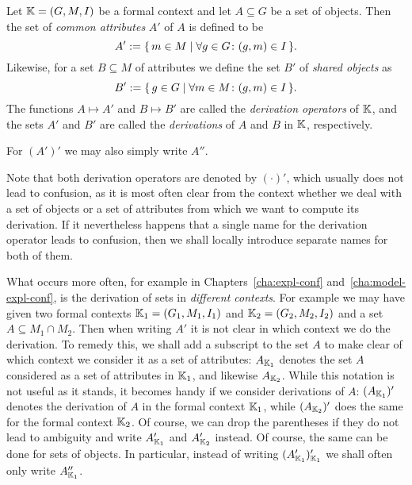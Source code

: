 \begin{Definition}
  \label{def:contextual-derivation}
  Let ${\mathbb{K}} = (G, M, I)$ be a formal context and let $A \subseteq G$ be a set of
  objects.  Then the set of \emph{common attributes} $A'$ of $A$ is defined to be
  \begin{equation*}
    A' := {\{\, m \in M \mid \forall g \in G \colon (g, m) \in I \,\}}.
  \end{equation*}
  Likewise, for a set $B \subseteq M$ of attributes we define the set $B'$ of \emph{shared
    objects} as
  \begin{equation*}
    B' := {\{\, g \in G \mid \forall m \in M \colon (g, m) \in I \,\}}.
  \end{equation*}
  The functions $A \mapsto A'$ and $B \mapsto B'$ are called the \emph{derivation
    operators} of ${\mathbb{K}}$, and the sets $A'$ and $B'$ are called the \emph{derivations}
  of $A$ and $B$ in ${\mathbb{K}}$, respectively.
\end{Definition}

For $(A')'$ we may also simply write $A''$.

Note that both derivation operators are denoted by $(\cdot)'$, which usually does not lead
to confusion, as it is most often clear from the context whether we deal with a set of
objects or a set of attributes from which we want to compute its derivation.  If it
nevertheless happens that a single name for the derivation operator leads to confusion,
then we shall locally introduce separate names for both of them.

What occurs more often, for example in Chapters~\ref{cha:expl-conf}
and~\ref{cha:model-expl-conf}, is the derivation of sets in \emph{different contexts}.
For example we may have given two formal contexts ${\mathbb{K}}_1 = (G_1, M_1, I_1)$ and ${\mathbb{K}}_2 = (G_2, M_2, I_2)$ and a set $A \subseteq M_1 \cap M_2$.  Then when writing $A'$ it is
not clear in which context we do the derivation.  To remedy this, we shall add a subscript
to the set $A$ to make clear of which context we consider it as a set of attributes:
$A_{{\mathbb{K}}_1}$ denotes the set $A$ considered as a set of attributes in ${\mathbb{K}}_1$, and
likewise $A_{{\mathbb{K}}_2}$.  While this notation is not useful as it stands, it becomes handy
if we consider derivations of $A$: $(A_{{\mathbb{K}}_1})'$ denotes the derivation of $A$ in the
formal context ${\mathbb{K}}_1$, while $(A_{{\mathbb{K}}_2})'$ does the same for the formal context
${\mathbb{K}}_2$.  Of course, we can drop the parentheses if they do not lead to ambiguity and
write $A_{{\mathbb{K}}_1}'$ and $A_{{\mathbb{K}}_2}'$ instead.  Of course, the same can be done for
sets of objects.  In particular, instead of writing $(A_{{\mathbb{K}}_1}')_{{\mathbb{K}}_1}'$ we shall
often only write $A_{{\mathbb{K}}_1}''$.

